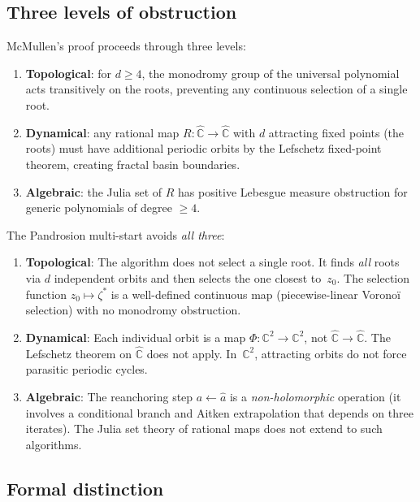 \documentclass[11pt,a4paper]{article}
\theoremstyle{definition}
\theoremstyle{remark}
\begin{document}
\subsection{Three levels of obstruction}

McMullen's proof proceeds through three levels:

\begin{enumerate}
\item \textbf{Topological}: for $d \geq 4$, the monodromy group of the universal polynomial acts transitively on the roots, preventing any continuous selection of a single root.
\item \textbf{Dynamical}: any rational map $R: \hat{\mathbb{C}} \to \hat{\mathbb{C}}$ with $d$ attracting fixed points (the roots) must have additional periodic orbits by the Lefschetz fixed-point theorem, creating fractal basin boundaries.
\item \textbf{Algebraic}: the Julia set of $R$ has positive Lebesgue measure obstruction for generic polynomials of degree $\geq 4$.
\end{enumerate}

The Pandrosion multi-start avoids \emph{all three}:

\begin{enumerate}
\item \textbf{Topological}: The algorithm does not select a single root.  It finds \emph{all} roots via $d$ independent orbits and then selects the one closest to~$z_0$.  The selection function $z_0 \mapsto \zeta^*$ is a well-defined continuous map (piecewise-linear Vorono\"i selection) with no monodromy obstruction.

\item \textbf{Dynamical}: Each individual orbit is a map $\Phi: \mathbb{C}^2 \to \mathbb{C}^2$, not $\hat{\mathbb{C}} \to \hat{\mathbb{C}}$.  The Lefschetz theorem on $\hat{\mathbb{C}}$ does not apply.  In~$\mathbb{C}^2$, attracting orbits do not force parasitic periodic cycles.

\item \textbf{Algebraic}: The reanchoring step $a \leftarrow \hat{a}$ is a \emph{non-holomorphic} operation (it involves a conditional branch and Aitken extrapolation that depends on three iterates).  The Julia set theory of rational maps does not extend to such algorithms.
\end{enumerate}

\subsection{Formal distinction}
\end{document}
